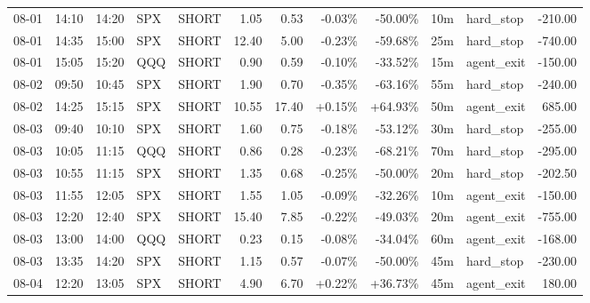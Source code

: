 \documentclass[11pt,a4paper,twoside]{article}
\begin{document}
\begin{center}
\begin{longtable}{>{\color{txtmain}}l l l l l r r r r r >{\color{txtmain}}l r}
08-01 & 14:10 & 14:20 & SPX & SHORT & 1.05 & 0.53 & \textcolor{lossred}{-0.03\%} & \textcolor{lossred}{-50.00\%} & 10m & hard\_stop & \textcolor{lossred}{-210.00} \\
08-01 & 14:35 & 15:00 & SPX & SHORT & 12.40 & 5.00 & \textcolor{lossred}{-0.23\%} & \textcolor{lossred}{-59.68\%} & 25m & hard\_stop & \textcolor{lossred}{-740.00} \\
08-01 & 15:05 & 15:20 & QQQ & SHORT & 0.90 & 0.59 & \textcolor{lossred}{-0.10\%} & \textcolor{lossred}{-33.52\%} & 15m & agent\_exit & \textcolor{lossred}{-150.00} \\
08-02 & 09:50 & 10:45 & SPX & SHORT & 1.90 & 0.70 & \textcolor{lossred}{-0.35\%} & \textcolor{lossred}{-63.16\%} & 55m & hard\_stop & \textcolor{lossred}{-240.00} \\
08-02 & 14:25 & 15:15 & SPX & SHORT & 10.55 & 17.40 & \textcolor{wingreen}{+0.15\%} & \textcolor{wingreen}{+64.93\%} & 50m & agent\_exit & \textcolor{wingreen}{685.00} \\
08-03 & 09:40 & 10:10 & SPX & SHORT & 1.60 & 0.75 & \textcolor{lossred}{-0.18\%} & \textcolor{lossred}{-53.12\%} & 30m & hard\_stop & \textcolor{lossred}{-255.00} \\
08-03 & 10:05 & 11:15 & QQQ & SHORT & 0.86 & 0.28 & \textcolor{lossred}{-0.23\%} & \textcolor{lossred}{-68.21\%} & 70m & hard\_stop & \textcolor{lossred}{-295.00} \\
08-03 & 10:55 & 11:15 & SPX & SHORT & 1.35 & 0.68 & \textcolor{lossred}{-0.25\%} & \textcolor{lossred}{-50.00\%} & 20m & hard\_stop & \textcolor{lossred}{-202.50} \\
08-03 & 11:55 & 12:05 & SPX & SHORT & 1.55 & 1.05 & \textcolor{lossred}{-0.09\%} & \textcolor{lossred}{-32.26\%} & 10m & agent\_exit & \textcolor{lossred}{-150.00} \\
08-03 & 12:20 & 12:40 & SPX & SHORT & 15.40 & 7.85 & \textcolor{lossred}{-0.22\%} & \textcolor{lossred}{-49.03\%} & 20m & agent\_exit & \textcolor{lossred}{-755.00} \\
08-03 & 13:00 & 14:00 & QQQ & SHORT & 0.23 & 0.15 & \textcolor{lossred}{-0.08\%} & \textcolor{lossred}{-34.04\%} & 60m & agent\_exit & \textcolor{lossred}{-168.00} \\
08-03 & 13:35 & 14:20 & SPX & SHORT & 1.15 & 0.57 & \textcolor{lossred}{-0.07\%} & \textcolor{lossred}{-50.00\%} & 45m & hard\_stop & \textcolor{lossred}{-230.00} \\
08-04 & 12:20 & 13:05 & SPX & SHORT & 4.90 & 6.70 & \textcolor{wingreen}{+0.22\%} & \textcolor{wingreen}{+36.73\%} & 45m & agent\_exit & \textcolor{wingreen}{180.00} \\

\end{longtable}
\end{center}
\end{document}
